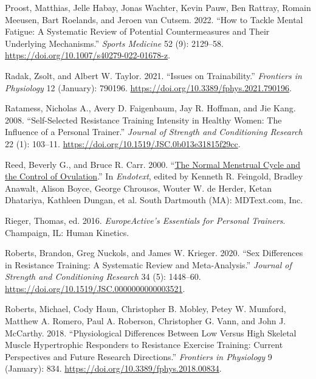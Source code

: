 \documentclass[
  letterpaper,
  DIV=11,
  numbers=noendperiod]{scrreprt}
\newlength{\cslhangindent}
\newenvironment{CSLReferences}[2] %
 {\begin{list}{}{%
  \setlength{\itemindent}{0pt}
  \setlength{\leftmargin}{0pt}
  \setlength{\parsep}{0pt}
  \ifodd #1
   \setlength{\leftmargin}{\cslhangindent}
   \setlength{\itemindent}{-1\cslhangindent}
  \fi
  \setlength{\itemsep}{#2\baselineskip}}}
 {\end{list}}
\begin{document}
\begin{CSLReferences}{1}{0}
Proost, Matthias, Jelle Habay, Jonas Wachter, Kevin Pauw, Ben Rattray,
Romain Meeusen, Bart Roelands, and Jeroen van Cutsem. 2022. {``How to
{Tackle Mental Fatigue}: {A Systematic Review} of {Potential
Countermeasures} and {Their Underlying Mechanisms}.''} \emph{Sports
Medicine} 52 (9): 2129--58.
\url{https://doi.org/10.1007/s40279-022-01678-z}.

Radak, Zsolt, and Albert W. Taylor. 2021. {``Issues on
{Trainability}.''} \emph{Frontiers in Physiology} 12 (January): 790196.
\url{https://doi.org/10.3389/fphys.2021.790196}.

Ratamess, Nicholas A., Avery D. Faigenbaum, Jay R. Hoffman, and Jie
Kang. 2008. {``Self-Selected Resistance Training Intensity in Healthy
Women: The Influence of a Personal Trainer.''} \emph{Journal of Strength
and Conditioning Research} 22 (1): 103--11.
\url{https://doi.org/10.1519/JSC.0b013e31815f29cc}.

Reed, Beverly G., and Bruce R. Carr. 2000.
{``\href{https://www.ncbi.nlm.nih.gov/pubmed/25905282}{The {Normal
Menstrual Cycle} and the {Control} of {Ovulation}}.''} In
\emph{Endotext}, edited by Kenneth R. Feingold, Bradley Anawalt, Alison
Boyce, George Chrousos, Wouter W. de Herder, Ketan Dhatariya, Kathleen
Dungan, et al. South Dartmouth (MA): MDText.com, Inc.

Rieger, Thomas, ed. 2016. \emph{{EuropeActive}'s Essentials for Personal
Trainers}. Champaign, IL: Human Kinetics.

Roberts, Brandon, Greg Nuckols, and James W. Krieger. 2020. {``Sex
{Differences} in {Resistance Training}: {A Systematic Review} and
{Meta-Analysis}.''} \emph{Journal of Strength and Conditioning Research}
34 (5): 1448--60. \url{https://doi.org/10.1519/JSC.0000000000003521}.

Roberts, Michael, Cody Haun, Christopher B. Mobley, Petey W. Mumford,
Matthew A. Romero, Paul A. Roberson, Christopher G. Vann, and John J.
McCarthy. 2018. {``Physiological {Differences Between Low Versus High
Skeletal Muscle Hypertrophic Responders} to {Resistance Exercise
Training}: {Current Perspectives} and {Future Research Directions}.''}
\emph{Frontiers in Physiology} 9 (January): 834.
\url{https://doi.org/10.3389/fphys.2018.00834}.


\end{CSLReferences}
\end{document}

